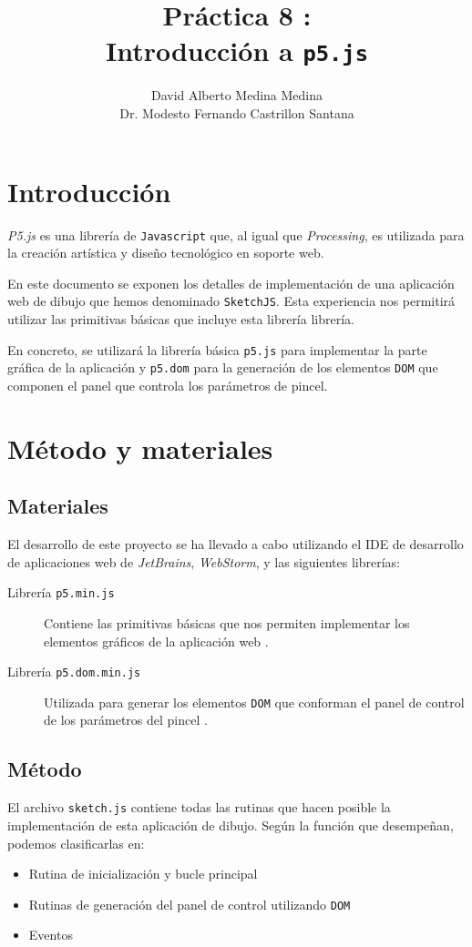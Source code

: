 \documentclass[10pt,a4paper]{report}
\author{David Alberto Medina Medina
	\\
	Dr. Modesto Fernando Castrillon Santana}
\title{Práctica 8 :\\ Introducción a \texttt{p5.js}}
\begin{document}
	\maketitle
	\tableofcontents
	
	\chapter{Introducción}
	\textit{P5.js} es una librería de \texttt{Javascript} que, al igual que \textit{Processing}, es utilizada para la creación artística y diseño tecnológico en soporte web.
	
	En este documento se exponen los detalles de implementación de una aplicación web de dibujo que hemos denominado \texttt{SketchJS}. Esta experiencia nos permitirá utilizar las primitivas básicas que incluye esta librería librería. 
	
	En concreto, se utilizará la librería básica \texttt{p5.js} para implementar la parte gráfica de la aplicación y \texttt{p5.dom} para la generación de los elementos \texttt{DOM} que componen el panel que controla los parámetros de pincel. 
	
	\chapter{Método y materiales}
	\section{Materiales}
	El desarrollo de este proyecto se ha llevado a cabo utilizando el IDE de desarrollo de aplicaciones web de \textit{JetBrains}, \textit{WebStorm}, y las siguientes librerías:
	
	\begin{description}
		\item[Librería \texttt{p5.min.js}] Contiene las primitivas básicas que nos permiten implementar los elementos gráficos de la aplicación web \cite{p5js-reference}.
		\item[Librería \texttt{p5.dom.min.js}] Utilizada para generar los elementos \texttt{DOM} que conforman el panel de control de los parámetros del pincel \cite{p5dom-reference}.
	\end{description}
	
	\section{Método}
	El archivo \texttt{sketch.js} contiene todas las rutinas que hacen posible la implementación de esta aplicación de dibujo. Según la función que desempeñan, podemos clasificarlas en:
	\begin{itemize}
	 \item Rutina de inicialización y bucle principal
	 \item Rutinas de generación del panel de control utilizando \texttt{DOM}
	 \item Eventos
	 \end{itemize} 
	
\end{document}
